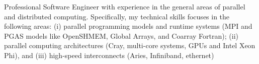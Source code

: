 Professional Software Engineer with experience in the general areas of parallel
and distributed computing. Specifically, my technical skills focuses in the
following areas:
(i)   parallel programming models and runtime systems (MPI and PGAS models like
      OpenSHMEM, Global Arrays, and Coarray Fortran);
(ii)  parallel computing architectures (Cray, multi-core systems, GPUs and Intel
      Xeon Phi), and
(iii) high-speed interconnects (Aries, Infiniband, ethernet)
